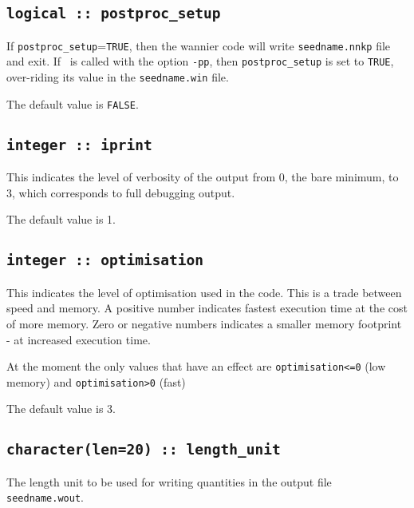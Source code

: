 \subsection[postproc\_setup]{\tt logical :: postproc\_setup}
If \verb#postproc_setup#=\verb#TRUE#, then the wannier code will write 
 {\tt seedname.nnkp} file and exit.
If \wannier\ is called with the option {\tt -pp}, then 
 \verb#postproc_setup# is set to 
\verb#TRUE#, over-riding its
value in the {\tt seedname.win} file.

The default value is \verb#FALSE#.


%


\subsection[iprint]{\tt integer :: iprint}

This indicates the level of verbosity of the output from 0,
the bare minimum, to 3, which corresponds to full debugging output.

The default value is 1.

\subsection[optimisation]{\tt integer :: optimisation}

This indicates the level of optimisation used in the code. This is a 
trade between speed and memory. A positive number indicates fastest execution time at the cost
of more memory. Zero or negative numbers indicates a smaller memory footprint - at increased
execution time. 

At the moment the only values that have an effect are \verb#optimisation<=0# (low memory) and \verb#optimisation>0# (fast)

The default value is 3.



\subsection[length\_unit]{\tt character(len=20) :: length\_unit}
The length unit to be used for writing quantities in the output file
{\tt seedname.wout}.

